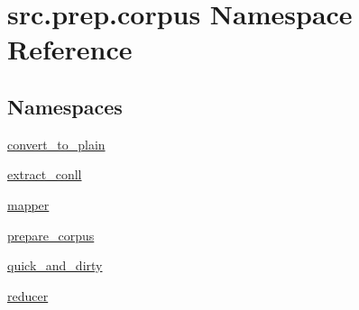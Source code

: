 \hypertarget{namespacesrc_1_1prep_1_1corpus}{}\section{src.\+prep.\+corpus Namespace Reference}
\label{namespacesrc_1_1prep_1_1corpus}
\subsection*{Namespaces}
\begin{DoxyCompactItemize}
\item 
 \hyperlink{namespacesrc_1_1prep_1_1corpus_1_1convert__to__plain}{convert\+\_\+to\+\_\+plain}
\item 
 \hyperlink{namespacesrc_1_1prep_1_1corpus_1_1extract__conll}{extract\+\_\+conll}
\item 
 \hyperlink{namespacesrc_1_1prep_1_1corpus_1_1mapper}{mapper}
\item 
 \hyperlink{namespacesrc_1_1prep_1_1corpus_1_1prepare__corpus}{prepare\+\_\+corpus}
\item 
 \hyperlink{namespacesrc_1_1prep_1_1corpus_1_1quick__and__dirty}{quick\+\_\+and\+\_\+dirty}
\item 
 \hyperlink{namespacesrc_1_1prep_1_1corpus_1_1reducer}{reducer}
\end{DoxyCompactItemize}
